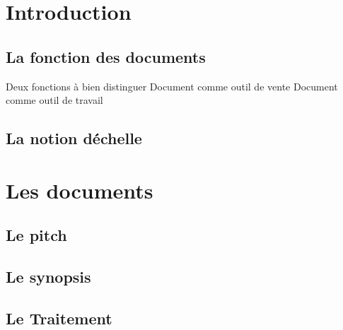 \chapter{Introduction}
\section{La fonction des documents}
Deux fonctions à bien distinguer\newline
Document comme outil de vente\newline
Document comme outil de travail\newline
\section{La notion d\'échelle}
\chapter{Les documents}
\section{Le pitch}
\section{Le synopsis}
\section{Le Traitement}
